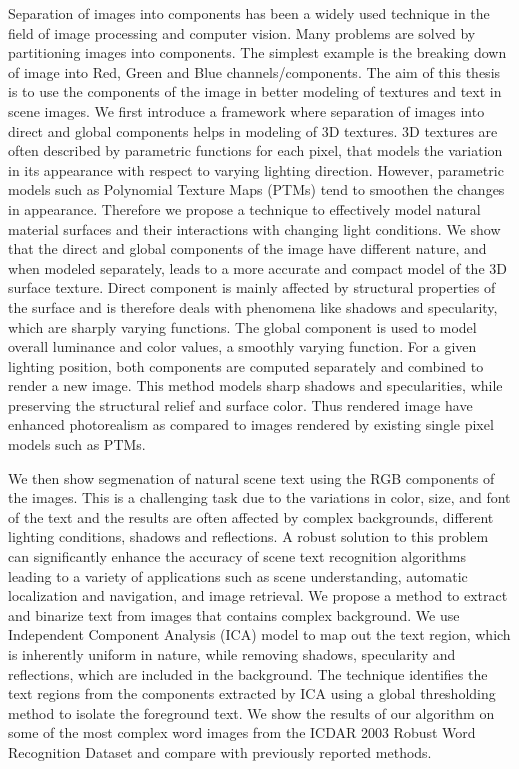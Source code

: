 Separation of images into components has been a widely used technique in the field of image processing and computer vision.
Many problems are solved by partitioning images into components. The simplest example
is the breaking down of image into Red, Green and Blue channels/components. The aim of this thesis is to use
the components of the image in better modeling of textures and text in scene images.
We first introduce a framework where separation of images 
into direct and global components helps in modeling of 3D textures.
3D textures are often described by parametric functions for each pixel, that
models the variation in its appearance with respect to varying lighting
direction. However, parametric models such as Polynomial Texture Maps (PTMs)
tend to smoothen the changes in appearance. Therefore we propose a technique to
effectively model natural material surfaces and their interactions with changing
light conditions. We show that the direct and global components of the image
have different nature, and when modeled separately, leads to a more accurate and
compact model of the 3D surface texture. Direct component is mainly affected by
structural properties of the surface and is therefore deals with phenomena like
shadows and specularity, which are sharply varying functions. The global
component is used to model overall luminance and color values, a smoothly
varying function. For a given lighting position, both components are computed
separately and combined to render a new image. This method models sharp shadows
and specularities, while preserving the structural relief and surface color.
Thus rendered image have enhanced photorealism as compared to images rendered by
existing single pixel models such as PTMs. 

We then show segmenation of natural scene text using the RGB components of the images.
This is a challenging task due to the variations in color, size, and font
of the text and the results are often affected by complex backgrounds, 
different lighting conditions, shadows and reflections.
A robust solution to this problem can significantly enhance
the accuracy of scene text recognition algorithms leading to a
variety of applications such as scene understanding, automatic
localization and navigation, and image retrieval. 
We propose a method to extract and binarize text from images
that contains complex background. We use Independent
Component Analysis (ICA) model to map out the text
region, which is inherently uniform in nature, while removing
shadows, specularity and reflections, which are included in
the background. The technique identifies the text regions from
the components extracted by ICA using a global thresholding
method to isolate the foreground text. We show the results
of our algorithm on some of the most complex word images
from the ICDAR 2003 Robust Word Recognition Dataset and
compare with previously reported methods.
